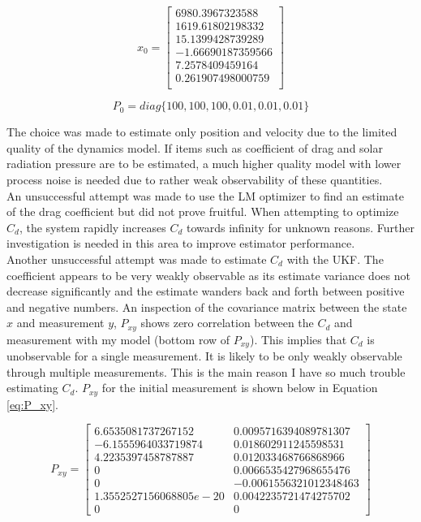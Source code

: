 \documentclass[11pt]{article}
\begin{document}
\begin{equation}
	\label{eq:LM_IC}
	x_0 = \begin{bmatrix}
	6980.3967323588 \\
	1619.61802198332 \\
	15.1399428739289 \\
	-1.66690187359566 \\
	7.2578409459164 \\
	0.261907498000759 \\	
	\end{bmatrix}
\end{equation}

\begin{equation}
	\label{eq:P0}
	P_0 = diag \{ 100, 100, 100, 0.01, 0.01, 0.01 \}
\end{equation}

The choice was made to estimate only position and velocity due to the limited quality of the dynamics model. If items such as coefficient of drag and solar radiation pressure are to be estimated, a much higher quality model with lower process noise is needed due to rather weak observability of these quantities. \\

An unsuccessful attempt was made to use the LM optimizer to find an estimate of the drag coefficient but did not prove fruitful. When attempting to optimize $C_d$, the system rapidly increases $C_d$ towards infinity for unknown reasons. Further investigation is needed in this area to improve estimator performance. \\

Another unsuccessful attempt was made to estimate $C_d$ with the UKF. The coefficient appears to be very weakly observable as its estimate variance does not decrease significantly and the estimate wanders back and forth between positive and negative numbers. An inspection of the covariance matrix between the state $x$ and measurement $y$, $P_{xy}$ shows zero correlation between the $C_d$ and measurement with my model (bottom row of $P_{xy}$). This implies that $C_d$ is unobservable for a single measurement. It is likely to be only weakly observable through multiple measurements. This is the main reason I have so much trouble estimating $C_d$. $P_{xy}$ for the initial measurement is shown below in Equation \eqref{eq:P_xy}.

\begin{equation}
\label{eq:P_xy}
P_{xy} = \begin{bmatrix}
    6.6535081737267152 & 0.0095716394089781307 \\
   -6.1555964033719874 &  0.018602911245598531 \\
    4.2235397458787887 &  0.012033468766868966 \\
                     0 & 0.0066535427968655476 \\
                     0 & -0.0061556321012348463 \\
1.3552527156068805e-20 & 0.0042235721474275702 \\
                     0 &                     0
\end{bmatrix}
\end{equation}
\end{document}
